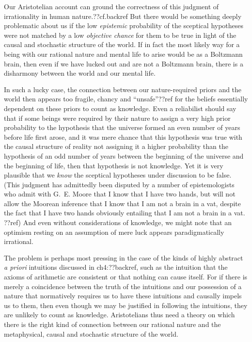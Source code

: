 Our Aristotelian account can ground the correctness of this judgment of irrationality in human nature.??cf.backref 
But there would be something deeply problematic about us if the low \textit{epistemic} probability of the sceptical hypotheses 
were not matched by a low \textit{objective chance} for them to be true in light of the causal and stochastic structure of the world. 
If in fact the most likely way for a being with our rational nature and mental life to arise would be as a Boltzmann
brain, then even if we have lucked out and are not a Boltzmann brain, there is a disharmony between the world and our
mental life. 

In such a lucky case, the connection between our nature-required priors and the world then appears too fragile, chancy and ``unsafe''??ref
for the beliefs essentially dependent on these priors to count as knowledge. Even a reliabilist should say that if some beings
were required by their nature to assign a very high prior probability to the hypothesis that the universe formed an even number 
of years before life first arose, and it was mere chance that this hypothesis was true with the causal structure of reality
not assigning it a higher probability than the hypothesis of an odd number of years between the beginning of the universe and
the beginning of life, then that hypothesis is not knowledge. Yet it is very plausible that we \textit{know} the sceptical hypotheses
under discussion to be false. (This judgment has admittedly been disputed by a number of epistemologists who admit with G.~E. Moore that
I know that I have two hands, but will not allow the Moorean inference that I know that I am not a brain in a vat, despite the fact that I have two hands
obviously entailing that I am not a brain in a vat. ??ref) And even without considerations of knowledge, we might note that an optimism
resting on an assumption of mere luck appears paradigmatically irrational. 

The problem is perhaps most pressing in the case of the kinds of highly abstract \textit{a priori} intuitions discussed in ch4:??backref,
such as the intuition that the axioms of arithmetic are consistent or that nothing can cause itself. For if there is merely a coincidence
between the truth of the intuitions and our possession of  a nature that normatively requires us to have these intuitions and causally 
impels us to them, then even though we may be justified in following the intuitions, they are unlikely to count as knowledge.
Aristotelians thus need a theory on which there is the right kind of connection between our rational nature and the metaphysical, causal and 
stochastic structure of the world. 


